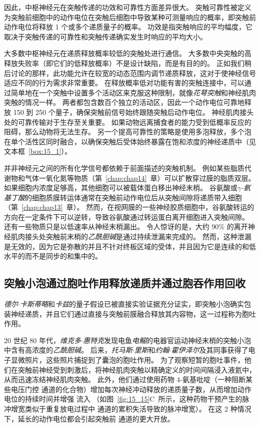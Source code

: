 因此，中枢神经元在突触传递的功效和可靠性方面差异很大。
突触可靠性被定义为突触前细胞中的动作电位在突触后细胞中导致某种可测量响应的概率，即突触前动作电位将释放 1 个或多个递质量子的概率。
功效是指突触响应的平均幅度，它取决于突触传递的可靠性和突触传递确实发生时响应的平均大小。


大多数中枢神经元在递质释放概率较低的突触处进行通信。
大多数中央突触的高释放失败率（即它们的低释放概率）不是设计缺陷，而是有目的的。
正如我们稍后讨论的那样，此功能允许在较宽的动态范围内调节递质释放，这对于使神经信号适应不同的行为需求非常重要。
在释放概率低对功能有害的突触连接中，可以通过简单地在一个突触中设置多个活动区来克服这种限制，就像\textit{花萼突触}和神经肌肉突触的情况一样。
两者都包含数百个独立的活动区，因此一个动作电位可靠地释放 150 到 250 个量子，确保突触前信号始终跟随突触后动作电位。
神经肌肉接头处的可靠传输对于生存至关重要。
如果动物远离捕食者的能力受到低概率反应的阻碍，那么动物将无法生存。
另一个提高可靠性的策略是使用多泡释放，多个泡在单个活性区同时融合，以确保突触后受体始终暴露在饱和浓度的神经递质中（见文本框~\ref{box:15_1}）。


并非神经元之间的所有化学信号都依赖于前面描述的突触机制。
例如某些脂质代谢物和气体一氧化氮等物质（第~\ref{chap:chap14}~章）可以扩散穿过膜的脂质双层。
如果细胞内浓度足够高，其他细胞可以被载体蛋白移出神经末梢。
谷氨酸或\textit{$\gamma$-氨基丁酸}的细胞质膜转运体通常在突触前动作电位后从突触间隙将递质带入细胞（第~\ref{chap:chap13}~章）。
然而，在视网膜的一些神经胶质细胞中，谷氨酸转运的方向在一定条件下可以逆转，导致谷氨酸通过转运蛋白离开细胞进入突触间隙。
还有一些物质只是以低速率从神经末梢漏出。
令人惊讶的是，大约 90\% 的离开神经肌肉接头处突触前末梢的\textit{乙酰胆碱}是通过持续泄漏来完成的。
然而，这种泄漏是无效的，因为它是弥散的并且不针对终板区域的受体，并且因为它是连续的和低水平的而不是同步的和集中的。



\subsection{突触小泡通过胞吐作用释放递质并通过胞吞作用回收}

\textit{德尔$\cdot$卡斯蒂略}和\textit{卡兹}的量子假设已被直接实验证据充分证实，即突触小泡确实包装神经递质，并且它们通过直接与突触前膜融合释放其内容物，这一过程称为胞吐作用。


20 世纪 80 年代，\textit{维克多$\cdot$惠特克}发现电鱼\textit{电鳐}的电器官运动神经末梢的突触小泡中含有高浓度的\textit{乙酰胆碱}\cite{whittaker1993thirty}。
后来，\textit{托马斯$\cdot$里斯}和\textit{约翰$\cdot$霍伊泽尔}及其同事获得了电子显微照片，这些照片捕捉到了囊泡的胞吐作用。
为了观察短暂的胞吐事件，他们在突触前神经受到刺激后，将神经肌肉突触以精确定义的时间间隔浸入液氦中，从而迅速冻结神经肌肉突触。
此外，他们通过使用药物 4-氨基吡啶（一种阻断某些电压门控  通道的化合物）增加每次神经冲动释放的递质量子数，从而增加动作电位的持续时间并增强  流入
（如图~\ref{fig:15_15}C~所示，这种药物干预产生的脉冲增宽类似于重复放电过程中  通道的累积失活导致的脉冲增宽）。
在这 2 种情况下，延长的动作电位都会引起突触前  通道的更大开放。


